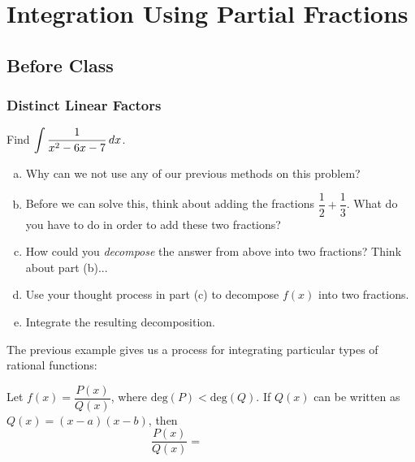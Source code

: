 \documentclass[notes]{subfiles}
\begin{document}
	\fancyhead[LO,RE]{\bfseries \small \currentname}
	\fancyfoot[C]{{}}
	\fancyfoot[RO,LE]{\large \thepage}	%
	
\section*{Integration Using Partial Fractions}\label{cs74}
	\subsection*{Before Class}
	\subsubsection*{Distinct Linear Factors}
		\begin{ex}
			Find $\displaystyle \int\dfrac{1}{x^2-6x-7}\, dx$.
			\begin{enumerate}[(a)]
				\item Why can we not use any of our previous methods on this problem?
				\item Before we can solve this, think about adding the fractions $\dfrac{1}{2} + \dfrac{1}{3}$.  What do you have to do in order to add these two fractions?
				\item How could you \emph{decompose} the answer from above into two fractions?  Think about part (b)...
				\item Use your thought process in part (c) to decompose $f(x)$ into two fractions. 
					\newpage
					
				\item Integrate the resulting decomposition.
			\end{enumerate}
		\end{ex}
		
		The previous example gives us a process for integrating particular types of rational functions:
		\begin{rmk}
			Let $f(x) = \dfrac{P(x)}{Q(x)}$, where $\text{deg}(P) < \text{deg}(Q)$.  If $Q(x)$ can be written as $Q(x) = (x-a)(x-b)$, then 
				\[\dfrac{P(x)}{Q(x)} = \qquad \qquad\qquad\]
		\end{rmk}
		
\end{document}

